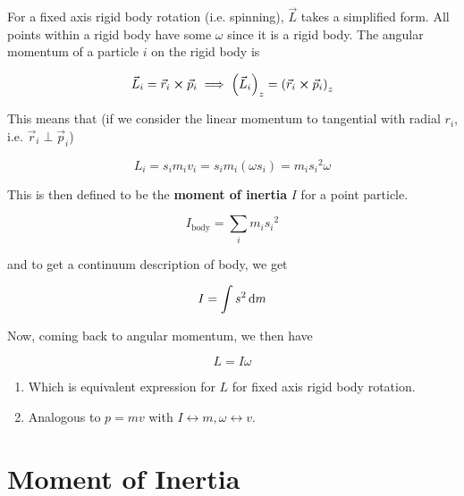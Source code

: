 For a fixed axis rigid body rotation (i.e. spinning), $\vec L$ takes a simplified form. All points within a rigid body have some $\omega$ since it is a rigid body. The angular momentum of a particle $i$ on the rigid body is

\begin{equation}
	\vec L_i = \vec r_i \cross \vec p_i \implies \left(\vec L_i\right)_z = \left(\vec r_i \cross \vec p_i \right)_z
\end{equation}

This means that (if we consider the linear momentum to tangential with radial $r_i$, i.e. $\vec r_i \perp \vec p_i$)

\begin{equation}
	L_i = s_i m_i v_i = s_i m_i (\omega s_i) = m_i {s_i}^2 \omega
\end{equation}

This is then defined to be the \textbf{moment of inertia} $I$ for a point particle.

\begin{definition}
	\begin{equation}
		I_\mathrm{body} = \sum_i m_i {s_i}^2
	\end{equation}

	and to get a continuum description of body, we get

	\begin{equation}
		I = \int s^2 \D m
	\end{equation}
\end{definition}

Now, coming back to angular momentum, we then have

\begin{definition}
	\begin{equation}
		L = I\omega
	\end{equation}

	\begin{enumerate}
		\item Which is equivalent expression for $L$ for fixed axis rigid body rotation.
		\item Analogous to $p = mv$ with $I \leftrightarrow m, \omega \leftrightarrow v$.
	\end{enumerate}
\end{definition}

\section{Moment of Inertia}

